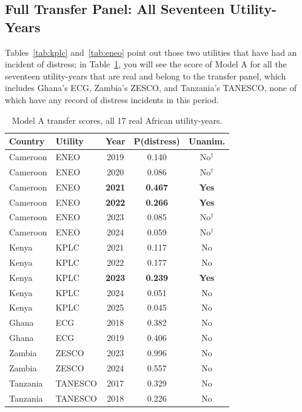 \documentclass[final,1p,times]{elsarticle}
\begin{document}
\subsection{Full Transfer Panel: All Seventeen Utility-Years}
\label{S:results-full-transfer}

Tables~\ref{tab:kplc} and~\ref{tab:eneo} point out those two utilities that have had an incident of distress; in Table~\ref{tab:full-transfer}, you will see the score of Model A for all the seventeen utility-years that are real and belong to the transfer panel, which includes Ghana's ECG, Zambia's ZESCO, and Tanzania's TANESCO, none of which have any record of distress incidents in this period.

\begin{table}[h]
\centering
\small
\caption{Model A transfer scores, all 17 real African utility-years.}
\label{tab:full-transfer}
\begin{tabular}{llccc}
\toprule
\textbf{Country} & \textbf{Utility} & \textbf{Year} & \textbf{P(distress)} & \textbf{Unanim.} \\
\midrule
Cameroon & ENEO & 2019 & 0.140 & No$^\dagger$ \\
Cameroon & ENEO & 2020 & 0.086 & No$^\dagger$ \\
Cameroon & ENEO & \textbf{2021} & \textbf{0.467} & \textbf{Yes} \\
Cameroon & ENEO & \textbf{2022} & \textbf{0.266} & \textbf{Yes} \\
Cameroon & ENEO & 2023 & 0.085 & No$^\dagger$ \\
Cameroon & ENEO & 2024 & 0.059 & No$^\dagger$ \\
Kenya & KPLC & 2021 & 0.117 & No \\
Kenya & KPLC & 2022 & 0.177 & No \\
Kenya & KPLC & \textbf{2023} & \textbf{0.239} & \textbf{Yes} \\
Kenya & KPLC & 2024 & 0.051 & No \\
Kenya & KPLC & 2025 & 0.045 & No \\
Ghana & ECG & 2018 & 0.382 & No \\
Ghana & ECG & 2019 & 0.406 & No \\
Zambia & ZESCO & 2023 & 0.996 & No \\
Zambia & ZESCO & 2024 & 0.557 & No \\
Tanzania & TANESCO & 2017 & 0.329 & No \\
Tanzania & TANESCO & 2018 & 0.226 & No \\
\bottomrule
\end{tabular}
\end{table}
\end{document}
